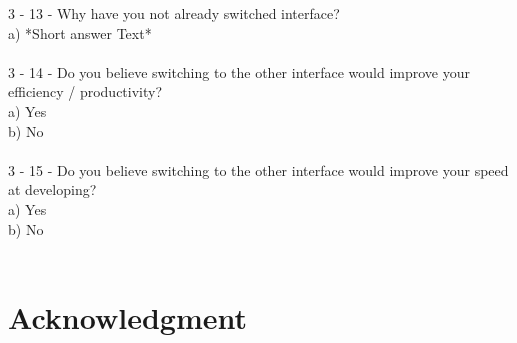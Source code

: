 \documentclass[]{report}
\begin{document}
	3 - 13 - Why have you not already switched interface?\\
	a) *Short answer Text*\\\\
	3 - 14 - Do you believe switching to the other interface would improve your efficiency / productivity?\\
	a) Yes\\
	b) No\\\\
	3 - 15 - Do you believe switching to the other interface would improve your speed at developing?\\
	a) Yes\\
	b) No\\\\
	\section{Acknowledgment}


\printbibliography[title=References]
\end{document}

